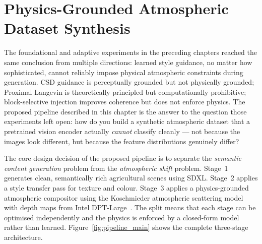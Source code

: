 \chapter{Physics-Grounded Atmospheric Dataset Synthesis}
\label{chap:phase2_pipeline}

The foundational and adaptive experiments in the preceding chapters reached the same conclusion from multiple directions: learned style guidance, no matter how sophisticated, cannot reliably impose physical atmospheric constraints during generation. CSD guidance is perceptually grounded but not physically grounded; Proximal Langevin is theoretically principled but computationally prohibitive; block-selective injection improves coherence but does not enforce physics. The proposed pipeline described in this chapter is the answer to the question those experiments left open: how do you build a synthetic atmospheric dataset that a pretrained vision encoder actually \emph{cannot} classify cleanly — not because the images look different, but because the feature distributions genuinely differ?

The core design decision of the proposed pipeline is to separate the \emph{semantic content generation} problem from the \emph{atmospheric shift} problem. Stage~1 generates clean, semantically rich agricultural scenes using SDXL. Stage~2 applies a style transfer pass for texture and colour. Stage~3 applies a physics-grounded atmospheric compositor using the Koschmieder atmospheric scattering model~\cite{koschmieder1924theorie} with depth maps from Intel DPT-Large~\cite{ranftl2021dpt}. The split means that each stage can be optimised independently and the physics is enforced by a closed-form model rather than learned. Figure~\ref{fig:pipeline_main} shows the complete three-stage architecture.

